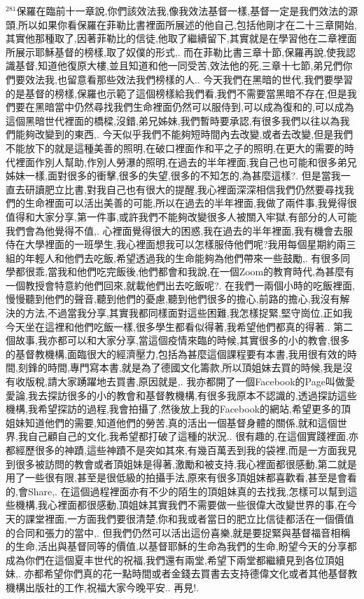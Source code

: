 \documentclass{book}
\begin{document}
$^{281}$保羅在臨前十一章說,你們該效法我,像我效法基督一樣,基督一定是我們效法的源頭,所以如果你看保羅在菲勒比書裡面所展述的他自己,包括他剛才在二十三章開始,其實他那種取了,因著菲勒比的信徒,他取了繼續留下,其實就是在學習他在二章裡面所展示耶穌基督的榜樣,取了奴僕的形式,.
而在菲勒比書三章十節,保羅再說,使我認識基督,知道他復原大樓,並且知道和他一同受苦,效法他的死,三章十七節,弟兄們你們要效法我,也留意看那些效法我們榜樣的人..
今天我們在黑暗的世代,我們要學習的是基督的榜樣,保羅也示範了這個榜樣給我們看,我們不需要當黑暗不存在,但是我們要在黑暗當中仍然尋找我們生命裡面仍然可以服侍到,可以成為復和的,可以成為這個黑暗世代裡面的橋樑,沒錯,弟兄姊妹,我們暫時要承認,有很多我們以往以為我們能夠改變到的東西,.
今天似乎我們不能夠短時間內去改變,或者去改變,但是我們不能放下的就是這種美善的照明,在破口裡面作和平之子的照明,在更大的需要的時代裡面作別人幫助,作別人勞瀑的照明,在過去的半年裡面,我自己也可能和很多弟兄姊妹一樣,面對很多的衝擊,很多的失望,很多的不知怎的,為甚麼這樣?.
但是當我一直去研讀肥立比書,對我自己也有很大的提醒,我心裡面深深相信我們仍然要尋找我們的生命裡面可以活出美善的可能,所以在過去的半年裡面,我做了兩件事,我覺得很值得和大家分享,第一件事,或許我們不能夠改變很多人被關入牢獄,有部分的人可能我們會為他覺得不值,.
心裡面覺得很大的困惑,我在過去的半年裡面,我有機會去服侍在大學裡面的一班學生,我心裡面想我可以怎樣服侍他們呢?我用每個星期約兩三組的年輕人和他們去吃飯,希望透過我的生命能夠為他們帶來一些鼓勵,.
有很多同學都很乖,當我和他們吃完飯後,他們都會和我說,在一個Zoom的教育時代,為甚麼有一個教授會特意約他們回來,就載他們出去吃飯呢?.
在我們一兩個小時的吃飯裡面,慢慢聽到他們的聲音,聽到他們的憂慮,聽到他們很多的擔心,前路的擔心,我沒有解決的方法,不過當我分享,其實我都同樣面對這些困難,我怎樣捉緊,堅守崗位,正如我今天坐在這裡和他們吃飯一樣,很多學生都看似得著,我希望他們都真的得著..
第二個故事,我亦都可以和大家分享,當這個疫情來臨的時候,其實很多的小的教會,很多的基督教機構,面臨很大的經濟壓力,包括為甚麼這個課程要有本書,我用很有效的時間,刻鋒的時間,專門寫本書,就是為了德國文化籌款,所以頂姐妹去買的時候,我是沒有收版稅,請大家踴躍地去買書,原因就是,.
我亦都開了一個Facebook的Page叫做愛愛論,我去探訪很多的小的教會和基督教機構,有很多我原本不認識的,透過探訪這些機構,我希望探訪的過程,我會拍攝了,然後放上我的Facebook的網站,希望更多的頂姐妹知道他們的需要,知道他們的勞苦,真的活出一個基督身體的關係,就和這個世界,我自己顧自己的文化,我希望都打破了這種的狀況..
很有趣的,在這個實踐裡面,亦都經歷很多的神蹟,這些神蹟不是突如其來,有幾百萬丟到我的袋裡,而是一方面我見到很多被訪問的教會或者頂姐妹是得著,激勵和被支持,我心裡面都很感動,第二就是用了一些很有限,甚至是很低級的拍攝手法,原來有很多頂姐妹都喜歡看,甚至是會看的,會Share,.
在這個過程裡面亦有不少的陌生的頂姐妹真的去找我,怎樣可以幫到這些機構,我心裡面都很感動,頂姐妹其實我們不需要做一些很偉大改變世界的事,在今天的課堂裡面,一方面我們要很清楚,你和我或者當日的肥立比信徒都活在一個價值的合同和張力的當中,.
但我們仍然可以活出這份喜樂,就是要捉緊與基督福音相稱的生命,活出與基督同等的價值,以基督耶穌的生命為我們的生命,盼望今天的分享都成為你們在這個夏丰世代的祝福,我們還有兩堂,希望下兩堂都繼續見到各位頂姐妹,.
亦都希望你們真的花一點時間或者金錢去買書去支持德偉文化或者其他基督教機構出版社的工作,祝福大家今晚平安..
再見!.
\newpage
\end{document}
